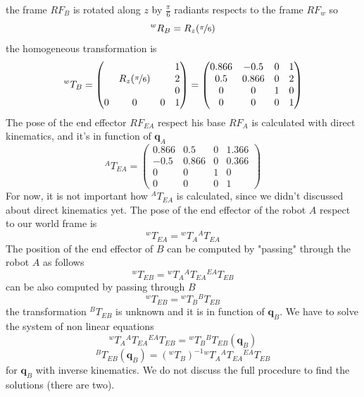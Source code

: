 \documentclass[10pt, letterpaper]{report}
\begin{document}
the frame $RF_B$ is rotated along $z$ by $\frac{\pi}{6}$ radiants respects to the frame $RF_w$ so\begin{equation}
    {}^wR_B=R_z(\nicefrac{\pi}{6})
\end{equation}
the homogeneous transformation is\begin{equation}
     {}^wT_B=\begin{pmatrix}
        &&&1\\ 
        &R_z(\nicefrac{\pi}{6})&&2\\
        &&&0\\
        0&0&0&1
     \end{pmatrix}=\begin{pmatrix}
        0.866&-0.5&0&1\\ 
        0.5&0.866&0&2\\
        0&0&1&0\\
        0&0&0&1
     \end{pmatrix}
\end{equation}
The pose of the end effector $RF_{EA}$ respect his base $RF_A$ is calculated with direct kinematics, and it's in function of $\mathbf q_A$\begin{equation}
    {}^AT_{EA}=\begin{pmatrix}
        0.866&0.5&0&1.366\\ 
        -0.5&0.866&0&0.366\\
        0&0&1&0\\
        0&0&0&1
     \end{pmatrix}
\end{equation}
For now, it is not important how ${}^AT_{EA}$ is calculated, since we didn't discussed about direct kinematics yet. The pose of the end effector of the robot $A$ respect to our world frame is\begin{equation}
    {}^wT_{EA}={}^wT_{A}{}^AT_{EA}
\end{equation}
The position of the end effector of $B$ can be computed by "passing" through the robot $A$ as follows\begin{equation}
    {}^wT_{EB}={}^wT_{A}{}^AT_{EA}{}^{EA}T_{EB}
\end{equation}
can be also computed by passing through $B$\begin{equation}
    {}^wT_{EB}={}^wT_{B}{}^BT_{EB}
\end{equation}
the transformation ${}^BT_{EB}$ is unknown and it is in function of $\mathbf q_B$. We have to solve the system of non linear equations \begin{equation}
    {}^wT_{A}{}^AT_{EA}{}^{EA}T_{EB}={}^wT_{B}{}^BT_{EB}(\mathbf q_B)
\end{equation}
\begin{equation}
    {}^BT_{EB}(\mathbf q_B)=({}^wT_{B})^{-1}{}^wT_{A}{}^AT_{EA}{}^{EA}T_{EB}
\end{equation}
for $\mathbf q_B$ with inverse kinematics. We do not discuss the full procedure to find the solutions (there are two).
\end{document}
